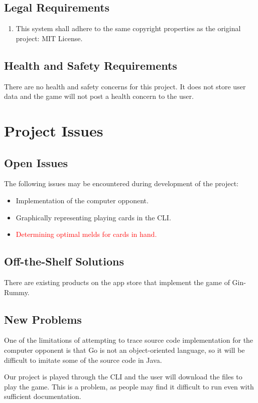 \documentclass[12pt, titlepage]{article}
\begin{document}
\subsection{Legal Requirements}
\begin{enumerate}[{L}.1]
    \item This system shall adhere to the same copyright properties as the original project: MIT License.
\end{enumerate}

\subsection{Health and Safety Requirements}
There are no health and safety concerns for this project. It does not store user data and the game will not post a health concern to the user.

\section{Project Issues}
\subsection{Open Issues}
The following issues may be encountered during development of the project:
\begin{itemize}
    \item Implementation of the computer opponent.
    \item Graphically representing playing cards in the CLI.
    \item \textcolor{red}{Determining optimal melds for cards in hand.}
\end{itemize}

\subsection{Off-the-Shelf Solutions}
There are existing products on the app store that implement the game of Gin-Rummy. 

\subsection{New Problems}
One of the limitations of attempting to trace source code implementation for the computer opponent is that Go is not an object-oriented language, so it will be difficult to imitate some of the source code in Java.

Our project is played through the CLI and the user will download the files to play the game. This is a problem, as people may find it difficult to run even with sufficient documentation. 
\end{document}
